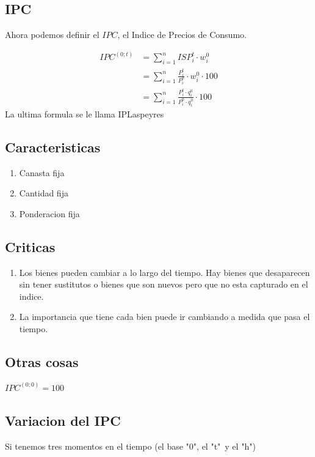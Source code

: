 \documentclass{report}
\begin{document}
\subsection{IPC}
Ahora podemos definir el \(IPC\), el Indice de Precios de Consumo.

\[
	\begin{array}{rl}
		IPC^{(0;t)}
		 & = \sum_{i=1}^{n}{ISP_i^t \cdot w_i^0}                                   \\
		 & = \sum_{i=1}^{n}{\frac{P_i^t}{P_i^o} \cdot w_i^0 \cdot 100}             \\
		 & = \sum_{i=1}^{n}{\frac{P_i^t \cdot q_i^0}{P_i^0 \cdot q_i^0} \cdot 100}
	\end{array}
\]
La ultima formula se le llama IPLaspeyres

\subsection{Caracteristicas}
\begin{enumerate}
	\item Canasta fija
	\item Cantidad fija
	\item Ponderacion fija
\end{enumerate}

\subsection{Criticas}
\begin{enumerate}
	\item Los bienes pueden cambiar a lo largo del tiempo. Hay bienes que desaparecen sin tener sustitutos o bienes que son nuevos pero que no esta capturado en el indice.
	\item La importancia que tiene cada bien puede ir cambiando a medida que pasa el tiempo.
\end{enumerate}

\subsection{Otras cosas}

\(IPC^{(0;0)} = 100\)

\subsection{Variacion del IPC}

Si tenemos tres momentos en el tiempo (el base "0", el "t"\ y el "h")
\end{document}
